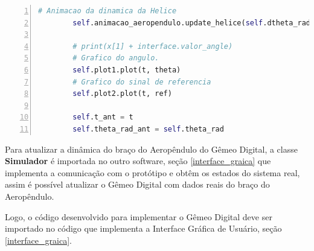 \begin{lstlisting}[language=python, numbers=left, label=python-example, captionpos=b, caption={Classe que implementa o Gêmeo Digital}]
        # Animacao da dinamica da Helice
        self.animacao_aeropendulo.update_helice(self.dtheta_rad, self.ts)

        # print(x[1] + interface.valor_angle)
        # Grafico do angulo.
        self.plot1.plot(t, theta)
        # Grafico do sinal de referencia
        self.plot2.plot(t, ref)

        self.t_ant = t
        self.theta_rad_ant = self.theta_rad

\end{lstlisting}

Para atualizar a dinâmica do braço do Aeropêndulo do Gêmeo Digital, a classe \textbf{Simulador} é importada no outro software, seção \ref{interface_graica} que implementa a comunicação com o protótipo e obtêm os estados do sistema real, assim é possível atualizar o Gêmeo Digital com dados reais do braço do Aeropêndulo.

Logo, o código desenvolvido para implementar o Gêmeo Digital deve ser importado no código que implementa a Interface Gráfica de Usuário, seção \ref{interface_graica}.